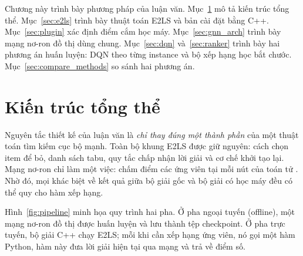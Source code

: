 \label{ch:chap3}

Chương này trình bày phương pháp của luận văn. Mục~\ref{sec:overview} mô tả kiến trúc tổng thể. Mục~\ref{sec:e2ls} trình bày thuật toán E2LS và bản cài đặt bằng C++. Mục~\ref{sec:plugin} xác định điểm cắm học máy. Mục~\ref{sec:gnn_arch} trình bày mạng nơ-ron đồ thị dùng chung. Mục~\ref{sec:dqn} và~\ref{sec:ranker} trình bày hai phương án huấn luyện: DQN theo từng instance và bộ xếp hạng học bắt chước. Mục~\ref{sec:compare_methods} so sánh hai phương án.

\section{Kiến trúc tổng thể}\label{sec:overview}

Nguyên tắc thiết kế của luận văn là \emph{chỉ thay đúng một thành phần} của một thuật toán tìm kiếm cục bộ mạnh. Toàn bộ khung E2LS được giữ nguyên: cách chọn item để bỏ, danh sách tabu, quy tắc chấp nhận lời giải và cơ chế khởi tạo lại. Mạng nơ-ron chỉ làm một việc: chấm điểm các ứng viên tại mỗi nút của toán tử \addstar. Nhờ đó, mọi khác biệt về kết quả giữa bộ giải gốc và bộ giải có học máy đều có thể quy cho hàm xếp hạng.

Hình~\ref{fig:pipeline} minh họa quy trình hai pha. Ở pha ngoại tuyến (offline), một mạng nơ-ron đồ thị được huấn luyện và lưu thành tệp checkpoint. Ở pha trực tuyến, bộ giải C++ chạy E2LS; mỗi khi \addstar cần xếp hạng ứng viên, nó gọi một hàm Python, hàm này đưa lời giải hiện tại qua mạng và trả về điểm số.

